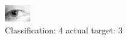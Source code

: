 \begin{figure}[h!]
\begin{center}
\includegraphics[width=0.60\columnwidth]{figures/ID1380_class_4_target_3.png}
\end{center}
\caption{ Classification: 4 actual target: 3}
\label{fig:ID1380_class_4_target_3}
\end{figure}
